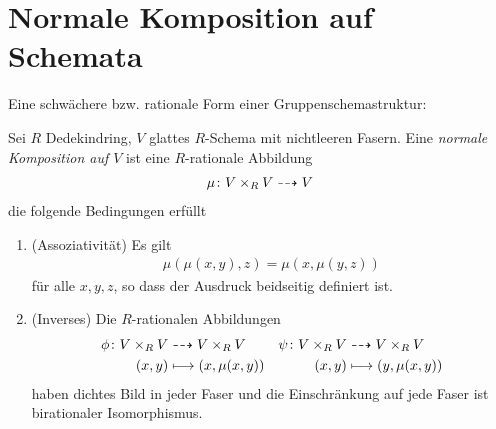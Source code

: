 \documentclass[german]{scrreprt}
\begin{document}

\section{Normale Komposition auf Schemata}
Eine schwächere bzw. rationale Form einer Gruppenschemastruktur:
\begin{Definition}\label{def:normalekomposition}
  Sei $R$ Dedekindring, $V$ glattes $R$-Schema mit nichtleeren Fasern.
  Eine \emph{normale Komposition auf $V$} ist eine $R$-rationale
  Abbildung
  \begin{gather*}
    \mu\colon V\times_R V\dashrightarrow V
  \end{gather*}
  die folgende Bedingungen erfüllt
  \begin{enumerate}[label=(\alph*)]
  \item (Assoziativität) Es gilt
    \begin{gather*}
      \mu(\mu(x,y),z)=\mu(x,\mu(y,z))
    \end{gather*}
    für alle $x,y,z$, so dass der Ausdruck beidseitig definiert ist.
  \item (Inverses)
    Die $R$-rationalen Abbildungen
    \begin{align*}
      \phi\colon V\times_R V
      &\dashrightarrow V\times_R V
      &\psi\colon V\times_R V
      & \dashrightarrow V\times_R V\\
      (x,y)
      &\longmapsto (x,\mu(x,y))
      &(x,y)
      &\longmapsto (y,\mu(x,y))       
    \end{align*}
    haben dichtes Bild in jeder Faser und die Einschränkung auf jede
    Faser ist birationaler Isomorphismus.
  \end{enumerate}
\end{Definition}
\end{document}
